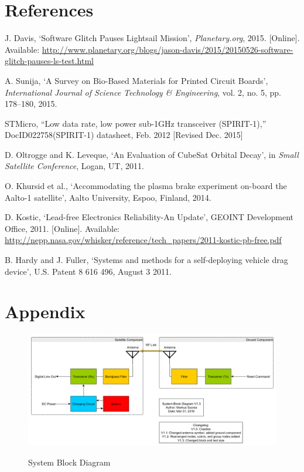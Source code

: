 \documentclass[12pt, twoside]{report}
\begin{document}
\chapter{References}
\begin{thebibliography}{9}
J. Davis,
`Software Glitch Pauses Lightsail Mission',
\textit{Planetary.org}, 2015. [Online]. Available: \url{http://www.planetary.org/blogs/jason-davis/2015/20150526-software-glitch-pauses-ls-test.html}

A. Sunija, `A Survey on Bio-Based Materials for Printed Circuit Boards', \textit{International Journal of Science Technology & Engineering}, vol. 2, no. 5, pp. 178–180, 2015.

STMicro, “Low data rate, low power sub-1GHz transceiver (SPIRIT-1),” DocID022758(SPIRIT-1) datasheet, Feb. 2012 [Revised Dec. 2015]

D. Oltrogge and K. Leveque, `An Evaluation of CubeSat Orbital Decay', in \textit{Small Satellite Conference}, Logan, UT, 2011.

O. Khursid et al., `Accommodating the plasma brake experiment on-board the Aalto-1 satellite', Aalto University, Espoo, Finland, 2014.

D. Kostic, `Lead-free Electronics Reliability-An Update', GEOINT Development Office, 2011. [Online]. Available: \url{http://nepp.nasa.gov/whisker/reference/tech_papers/2011-kostic-pb-free.pdf}

B. Hardy and J. Fuller, `Systems and methods for a self-deploying vehicle drag device', U.S. Patent 8 616 496, August 3 2011.

\end{thebibliography}

\appendix
\chapter{Appendix}
\begin{figure}
\caption{System Block Diagram}
\centering
\includegraphics[scale=0.5]{blockdiagram}
\label{blockdiagram}
\end{figure}
\end{document}
